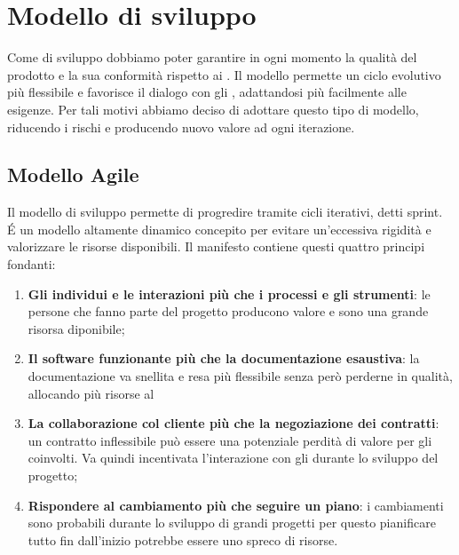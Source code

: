 \section{Modello di sviluppo}
Come  di sviluppo dobbiamo poter garantire in ogni momento la qualità del prodotto  e la sua conformità rispetto ai . \newline
Il modello  permette un ciclo evolutivo più flessibile e favorisce il dialogo con gli , adattandosi più facilmente alle esigenze. \newline 
Per tali motivi abbiamo deciso di adottare questo tipo di modello, riducendo i rischi e producendo nuovo valore ad ogni iterazione.

\subsection{Modello Agile}
Il modello di sviluppo  permette di progredire tramite cicli iterativi, detti sprint.
É un modello altamente dinamico concepito per evitare un'eccessiva rigidità e valorizzare le risorse disponibili. \newline
Il manifesto  contiene questi quattro principi fondanti:

\begin{enumerate}
    \item \textbf{Gli individui e le interazioni più che i processi e gli strumenti}: le persone che fanno parte del progetto producono valore e sono una grande risorsa diponibile;
    \item \textbf{Il software funzionante più che la documentazione esaustiva}: la documentazione va snellita e resa più flessibile senza però perderne in qualità, allocando più risorse al 
    \item \textbf{La collaborazione col cliente più che la negoziazione dei contratti}: un contratto inflessibile può essere una potenziale perdità di valore per gli  coinvolti. Va quindi incentivata l’interazione con gli  durante lo sviluppo del progetto;
    \item \textbf{Rispondere al cambiamento più che seguire un piano}: i cambiamenti sono probabili durante lo sviluppo di grandi progetti per questo pianificare tutto fin dall'inizio potrebbe essere uno spreco di risorse.
\end{enumerate}

